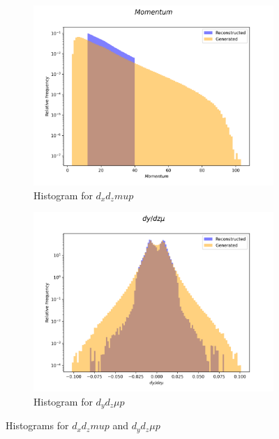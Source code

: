 \documentclass{article}
\begin{document}
\begin{figure}[H]
    \centering
    \begin{subfigure}[b]{0.45\textwidth}
        \includegraphics[width=\textwidth]{graphs/hadr_Momentum.png}
        \caption{Histogram for $d_xd_zmup$}
        \label{fig:had_Angle_mu}
    \end{subfigure}
    \hfill
    \begin{subfigure}[b]{0.45\textwidth}
        \includegraphics[width=\textwidth]{graphs/hadr_dy_dz_mu.png}
        \caption{Histogram for $d_yd_z \mu p$}
        \label{fig:had_Angle_u}
    \end{subfigure}
    \caption{Histograms for $d_xd_zmup$ and $d_yd_z \mu p$}
\end{figure}
\end{document}
